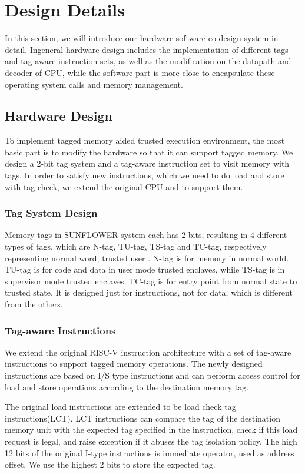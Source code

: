 \documentclass[conference]{IEEEtran}
\begin{document}
\section{Design Details}
In this section, we will introduce our hardware-software co-design system in detail. Ingeneral hardware design includes the implementation of different tags and tag-aware instruction sets, as well as the modification on the datapath and decoder of CPU, while the software part is more close to encapsulate these operating system calls and memory management. 

\subsection{Hardware Design}
To implement tagged memory aided trusted execution environment, the most basic part is to modify the hardware so that it can support tagged memory. We design a 2-bit tag system and a tag-aware instruction set to visit memory with tags. In order to satisfy new instructions, which we need to do load and store with tag check, we extend the original CPU and to support them. 

\subsubsection{Tag System Design}
Memory tags in SUNFLOWER system each has 2 bits, resulting in 4 different types of tags, which are N-tag, TU-tag, TS-tag and TC-tag, respectively representing normal word, trusted user . N-tag is for memory in normal world. TU-tag is for code and data in user mode trusted enclaves, while TS-tag is in supervisor mode trusted enclaves. TC-tag is for entry point from normal state to trusted state. It is designed just for instructions, not for data, which is different from the others. 

\subsubsection{Tag-aware Instructions}
We extend the original RISC-V instruction architecture with a set of tag-aware instructions to support tagged memory operations. The newly designed instructions are based on I/S type instructions and can perform access control for load and store operations according to the destination memory tag. 

The original load instructions are extended to be load check tag instructions(LCT). LCT instructions can compare the tag of the destination memory unit with the expected tag specified in the instruction, check if this load request is legal, and raise exception if it abuses the tag isolation policy. The high 12 bits of the original I-type instructions is immediate operator, used as address offset. We use the highest 2 bits to store the expected tag.
\end{document}
